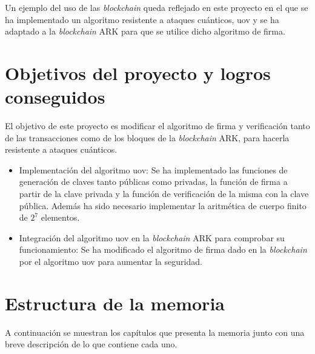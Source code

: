 Un ejemplo del uso de las \textit{blockchain} queda reflejado en este proyecto en el que se ha implementado un algoritmo resistente a ataques cuánticos, \acrshort{uov} \cite{algoritmo-UOV} y se ha adaptado a la \textit{blockchain} ARK \cite{ark} para que se utilice dicho algoritmo de firma.\\


\section{Objetivos del proyecto y logros conseguidos}
\label{sec:intro:objetivos}
El objetivo de este proyecto es modificar el algoritmo de firma y verificación tanto de las transacciones como de los bloques de la \textit{blockchain} ARK, para hacerla resistente a ataques cuánticos.

\begin{itemize}
	\item Implementación del algoritmo \acrshort{uov}: Se ha implementado las funciones de generación de claves tanto públicas como privadas, la función de firma a partir de la clave privada y la función de verificación de la misma con la clave pública. Además ha sido necesario implementar la aritmética de cuerpo finito de $2^7$ elementos.
	\item Integración del algoritmo \acrshort{uov} en la \textit{blockchain} ARK para comprobar su funcionamiento: Se ha modificado el algoritmo de firma dado en la \textit{blockchain} por el algoritmo \acrshort{uov} para aumentar la seguridad.

\end{itemize}


\section{Estructura de la memoria}

A continuación se muestran los capítulos que presenta la memoria junto con una breve descripción de lo que contiene cada uno.

